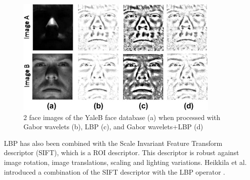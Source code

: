 \begin{figure}[!h]
\begin{center}
\noindent \includegraphics[scale=1]{figures/combination_lbp_gabor} 
\newline

\caption{2 face images of the YaleB face database (a) when processed with Gabor wavelets (b), LBP (c), and Gabor wavelets+LBP (d) \cite{GOH11}}
\label{combination_lbp_gabor}
\end{center} 
\end{figure}

\noindent  LBP has also been combined with the Scale Invariant Feature Transform descriptor (SIFT), which is a ROI descriptor. This descriptor is robust against image rotation, image translations, scaling and lighting variations. Heikkila et al. introduced a combination of the SIFT descriptor with the LBP operator \cite{HEI09}.
\newline

